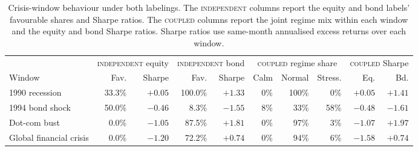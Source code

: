 \documentclass[10pt]{article}
\newcommand{\Acoup}{\textsc{coupled}}
\newcommand{\Bindep}{\textsc{independent}}
\begin{document}
\begin{table}[H]
    \centering
    \caption{Crisis-window behaviour under both labelings. The \Bindep{} columns report the equity
        and bond labels' favourable shares and Sharpe ratios. The \Acoup{} columns report the joint regime mix
        within each window and the equity and bond Sharpe ratios. Sharpe ratios use same-month
        annualised excess returns over each window.}
    \label{tab:crisis}
    \small
    \begin{adjustbox}{center,max width=1.18\textwidth}
        \begin{tabular}{lrrrrrrrrr}
            \toprule
                                    & \multicolumn{2}{c}{\Bindep{} equity} & \multicolumn{2}{c}{\Bindep{} bond} & \multicolumn{3}{c}{\Acoup{} regime share} & \multicolumn{2}{c}{\Acoup{} Sharpe}                                               \\
            \cmidrule(lr){2-3}\cmidrule(lr){4-5}\cmidrule(lr){6-8}\cmidrule(lr){9-10}
            Window                  & Fav.                                 & Sharpe                                  & Fav.                               & Sharpe                                    & Calm                                & Normal & Stress.        & Eq.     & Bd.     \\
            \midrule
            1990 recession          & \phantom{0}33.3\%                    & $+0.05$                                 & 100.0\%                            & $+1.33$                                   & 0\%                                 & 100\%  & \phantom{0}0\% & $+0.05$ & $+1.41$ \\
            1994 bond shock         & \phantom{0}50.0\%                    & $-0.46$                                 & \phantom{0}8.3\%                   & $-1.55$                                   & 8\%                                 & 33\%   & 58\%           & $-0.48$ & $-1.61$ \\
            Dot-com bust            & \phantom{0}0.0\%                     & $-1.05$                                 & 87.5\%                             & $+1.81$                                   & 0\%                                 & 97\%   & \phantom{0}3\% & $-1.07$ & $+1.97$ \\
            Global financial crisis & \phantom{0}0.0\%                     & $-1.20$                                 & 72.2\%                             & $+0.74$                                   & 0\%                                 & 94\%   & \phantom{0}6\% & $-1.58$ & $+0.74$ \\

\end{tabular}
\end{adjustbox}
\end{table}
\end{document}

